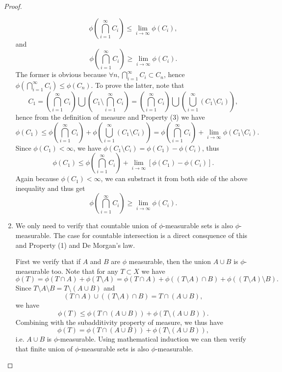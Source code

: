 \begin{proof}
\begin{enumerate}
  \[
    \phi\left(\bigcap_{i=1}^{\infty} C_i \right) \le\lim_{i\to\infty}\phi(C_i),
  \]
  and 
  \[
    \phi\left(\bigcap_{i=1}^{\infty} C_i \right) \ge\lim_{i\to\infty}\phi(C_i).
  \]
  The former is obvious because 
  $\forall n,\bigcap_{i=1}^{\infty}C_i \subset C_n$,
  hence $\phi(\bigcap_{i=1}^{\infty}C_i)\le\phi(C_n)$. To prove the latter, note 
  that
  \[
    C_1 = \left(\bigcap_{i=1}^{\infty} C_i \right)
          \bigcup \left( C_1\setminus \bigcap_{i=1}^{\infty} C_i \right)
        = \left(\bigcap_{i=1}^{\infty} C_i \right)
          \bigcup \left( \bigcup_{i=1}^{\infty} (C_1\setminus C_i) \right),
  \]
  hence from the definition of measure and Property (3) we have
  \[
    \phi(C_1) 
      \le \phi\left(\bigcap_{i=1}^{\infty} C_i \right)
          + \phi\left( \bigcup_{i=1}^{\infty} (C_1\setminus C_i) \right)
      = \phi\left(\bigcap_{i=1}^{\infty} C_i \right)
        + \lim_{i\to\infty} \phi(C_1\setminus C_i).
  \]
  Since $\phi(C_1)<\infty$, we have 
  $\phi(C_1\setminus C_i)=\phi(C_1)-\phi(C_i)$, thus
  \[
    \phi(C_1) 
      \le \phi\left(\bigcap_{i=1}^{\infty} C_i \right)
          + \lim_{i\to\infty} [\phi(C_1)-\phi(C_i)].
  \]
  Again because $\phi(C_1)<\infty$, we can substract it from both side of the
  above inequality and thus get
  \[
    \phi\left(\bigcap_{i=1}^{\infty} C_i \right) \ge\lim_{i\to\infty}\phi(C_i).
  \]
\item  
  We only need to verify that countable union of $\phi$-measurable sets is also
  $\phi$-measurable. The case for countable intersection is a direct consquence
  of this and Property (1) and De Morgan's law.

  First we verify that if $A$ and $B$ are $\phi$ measurable, then the union 
  $A\cup B$ is $\phi$-measurable too. Note that for any $T\subset X$ we have
  \[
    \phi(T)=\phi(T\cap A) + \phi(T\setminus A)
           =\phi(T\cap A) + \phi((T\setminus A)\cap B) 
            + \phi((T\setminus A)\setminus B).
  \]
  Since $T\setminus A\setminus B=T\setminus (A\cup B)$ and
  \[
    (T\cap A)\cup ((T\setminus A)\cap B) = T\cap (A\cup B),
  \]
  we have
  \[
    \phi(T)\le \phi(T\cap (A\cup B)) + \phi(T\setminus (A\cup B) ).
  \]
  Combining with the subadditivity property of measure, we thus have
  \[
    \phi(T)= \phi(T\cap (A\cup B)) + \phi(T\setminus (A\cup B) ),
  \]
  i.e. $A\cup B$ is $\phi$-measurable.
  Using mathematical induction we can then verify that finite union of 
  $\phi$-measurable sets is also $\phi$-measurable. 


\end{enumerate}
\end{proof}
